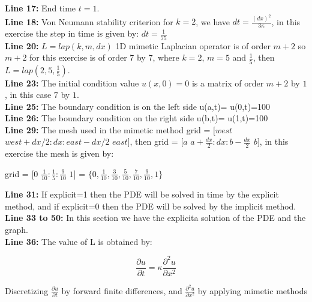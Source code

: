 \documentclass[a4paper,abstract=true]{scrreprt}
\begin{document}
\textbf{Line 17:} End time $t=1$.\\

\textbf{Line 18:} Von Neumann stability criterion for $k=2$, we have $ dt = \frac{(dx)^{2}}{3 \kappa}$, in this exercise the step in time is given by: $dt =\frac{1}{75}$\\

\textbf{Line 20:} $L = lap(k,m,dx)$ 1D mimetic Laplacian operator is of order $m+2$ so $m+2$ for this exercise is of order 7 by 7, where $k=2$, $m = 5$ and $\frac{1}{5}$, then $L = lap(2,5,\frac{1}{5})$.\\

\textbf{Line 23:} The initial condition  value $u(x,0)=0$ is a matrix of order $m+2$ by $1$, in this case $7$ by $1$.\\

\textbf{Line 25:} The boundary condition is on the left side u(a,t)= u(0,t)=100\\

\textbf{Line 26:} The boundary condition on the right side u(b,t)= u(1,t)=100\\

\textbf{Line 29:} The mesh used in the mimetic method  grid = $[west$  $west+dx/2: dx :east-dx/2$  $east]$, then grid = $[a$ $a+\frac{dx}{2}: dx : b-\frac{dx}{2}$ $b  ]$, in this exercise the mesh is given by:

\begin{center}

	grid = $[0$ $\frac{1}{10}: \frac{1}{5}: \frac{9}{10}$ $1]$ = $  \{0, \frac{1}{10}, \frac{3}{10}, \frac{5}{10}, \frac{7}{10}, \frac{9}{10}, 1 \}$

\end{center}

\textbf{Line 31:} If explicit=1 then the PDE will be solved in time by the explicit method, and if explicit=0 then the PDE will be solved by the implicit method.\\

\textbf{Line 33 to 50:} In this section we have the explicita solution of the PDE and the graph. \\

\textbf{Line 36:} The value of L is obtained by:

\begin{equation}
	\frac{\partial u}{\partial t} = \kappa \frac{\partial^{2} u}{\partial x^{2}}
\end{equation}

Discretizing $\frac{\partial u}{\partial t}$ by forward finite differences, and $\frac{\partial^{2} u}{\partial x^{2}}$ by applying mimetic methods
\end{document}
